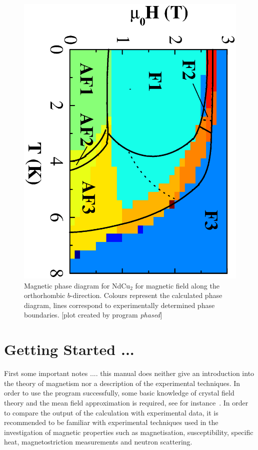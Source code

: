 \documentclass[twoside]{article}
\newcommand{\prg}{\sl}
\begin{document}
\begin{figure}[ht]\begin{center}
\includegraphics[angle=90,width=0.7\columnwidth]{figsrc/ndphased.ps}
\caption{\label{ndphased}
Magnetic phase diagram for NdCu$_2$ for magnetic field along
the orthorhombic $b$-direction. Colours represent the calculated phase
diagram, lines correspond to experimentally determined phase boundaries.
[plot created by program {\prg phased}]
}
\end{center}
\end{figure}


\section{Getting Started ...}  

First some important notes .... this manual does neither give an introduction into the theory of 
magnetism nor a description of the experimental techniques. In order
to use the program successfully, some basic knowledge of crystal field theory and the mean field
approximation is required, see for instance~\cite{jensen91-1}.
In order to compare the output of the calculation with experimental
data, it is recommended to be familiar with  experimental techniques used
in the investigation of magnetic properties
such as magnetisation, susceptibility, specific heat, magnetostriction
measurements and neutron scattering.
\end{document}
